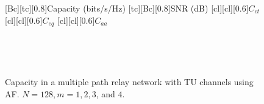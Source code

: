 \begin{figure}
    [Bc][tc][0.8]{Capacity (bits/s/Hz)}
    [tc][Bc][0.8]{SNR (dB)}
    [cl][cl][0.6]{$C_{ct}$}
    [cl][cl][0.6]{$C_{eq}$}
    [cl][cl][0.6]{$C_{aa}$}
\centerline{
	 \\
}
\centerline{
	 \\
}
\caption{Capacity in a multiple path relay network with TU channels using AF.  $N = 128, m = 1, 2, 3$, and $4$.}
\label{fig:mp_af_cap_plots_TU}
\end{figure}

